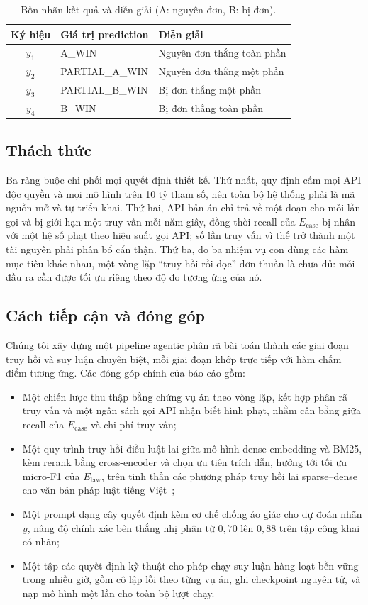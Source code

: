 \documentclass[conference]{IEEEtran}
\newcommand{\field}[1]{\textsf{\small #1}}
\begin{document}
\begin{table}[H]
  \caption{Bốn nhãn kết quả và diễn giải (A: nguyên đơn, B: bị đơn).}
  \label{tab:labels}
  \begin{tabular}{@{}cll@{}}
    \toprule
    Ký hiệu & Giá trị \field{prediction} & Diễn giải \\
    \midrule
    $y_1$ & \field{A\_WIN}          & Nguyên đơn thắng toàn phần \\
    $y_2$ & \field{PARTIAL\_A\_WIN} & Nguyên đơn thắng một phần \\
    $y_3$ & \field{PARTIAL\_B\_WIN} & Bị đơn thắng một phần \\
    $y_4$ & \field{B\_WIN}          & Bị đơn thắng toàn phần \\
    \bottomrule
  \end{tabular}
\end{table}

\subsection{Thách thức}
Ba ràng buộc chi phối mọi quyết định thiết kế. Thứ nhất, quy định cấm mọi API
độc quyền và mọi mô hình trên 10 tỷ tham số, nên toàn bộ hệ thống phải là mã
nguồn mở và tự triển khai. Thứ hai, API bản án chỉ trả về một đoạn cho mỗi lần
gọi và bị giới hạn một truy vấn mỗi năm giây, đồng thời recall của $E_{\text{case}}$
bị nhân với một hệ số phạt theo hiệu suất gọi API; số lần truy vấn vì thế trở
thành một tài nguyên phải phân bổ cẩn thận. Thứ ba, do ba nhiệm vụ con dùng các
hàm mục tiêu khác nhau, một vòng lặp ``truy hồi rồi đọc'' đơn thuần là chưa đủ:
mỗi đầu ra cần được tối ưu riêng theo độ đo tương ứng của nó.

\subsection{Cách tiếp cận và đóng góp}
Chúng tôi xây dựng một pipeline agentic phân rã bài toán thành các giai đoạn
truy hồi và suy luận chuyên biệt, mỗi giai đoạn khớp trực tiếp với hàm chấm điểm
tương ứng. Các đóng góp chính của báo cáo gồm:
\begin{itemize}
  \item Một chiến lược thu thập bằng chứng vụ án theo vòng lặp, kết hợp phân
    rã truy vấn và một ngân sách gọi API nhận biết hình phạt, nhằm cân bằng giữa
    recall của $E_{\text{case}}$ và chi phí truy vấn;
  \item Một quy trình truy hồi điều luật lai giữa mô hình dense embedding và BM25, kèm
    rerank bằng cross-encoder và chọn ưu tiên trích dẫn, hướng tới tối ưu
    micro-F1 của $E_{\text{law}}$, trên tinh thần các phương pháp truy hồi lai
    sparse--dense cho văn bản pháp luật tiếng Việt~\cite{b3,b4};
  \item Một prompt dạng cây quyết định kèm cơ chế chống ảo giác cho dự đoán
    nhãn $y$, nâng độ chính xác bên thắng nhị phân từ $0{,}70$ lên $0{,}88$ trên
    tập công khai có nhãn;
  \item Một tập các quyết định kỹ thuật cho phép chạy suy luận hàng loạt bền
    vững trong nhiều giờ, gồm cô lập lỗi theo từng vụ án, ghi checkpoint nguyên
    tử, và nạp mô hình một lần cho toàn bộ lượt chạy.
\end{itemize}
\end{document}
